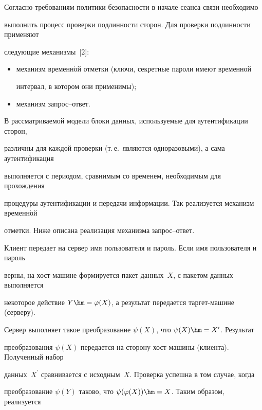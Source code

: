     


    Согласно требованиям политики безопасности в начале сеанса связи необходимо 


выполнить процесс проверки подлинности сторон. Для проверки подлинности применяют 


следующие механизмы~[2]:


    \begin{itemize}


\item механизм временн$\acute{\mbox{о}}$й отметки (ключи, секретные пароли имеют временной 


интервал, в котором они применимы);


\item механизм за\-прос--ответ.


    \end{itemize}


    


    В рассматриваемой модели блоки данных, используемые для аутентификации сторон, 


различны для каждой проверки (т.\,е.\ являются одноразовыми), а сама аутентификация 


выполняется с периодом, сравнимым со временем, необходимым для прохождения 


процедуры аутентификации и передачи информации. Так реализуется механизм временн$\acute{\mbox{о}}$й 


отметки. Ниже описана реализация механизма зап\-рос--ответ.


    


    Клиент передает на сервер имя пользователя и пароль. Если имя пользователя и пароль 


верны, на хост-ма\-ши\-не формируется пакет данных~$X$, с пакетом данных выполняется 


некоторое действие $Y\hm=\varphi(X)$, а результат передается тар\-гет-ма\-ши\-не (серверу). 


Сервер выполняет такое преобразование $\psi(X)$, что $\psi(X)\hm=X^\prime$. Результат 


преобразования $\psi(X)$  передается на сторону хост-машины (клиента). Полученный набор 


данных~$X^\prime$ сравнивается с исходным~$X$. Проверка успешна в том случае, когда 


преобразование $\psi(Y)$ таково, что $\psi(\varphi(X))\hm=X$. Таким образом, реализуется 


